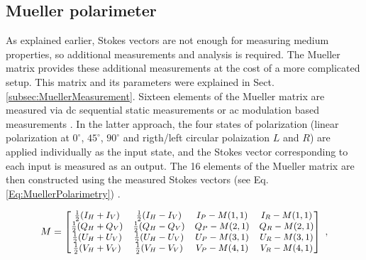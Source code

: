 %
%

	
\subsection{Mueller polarimeter}
As explained earlier, Stokes vectors are not enough for measuring medium properties, so additional measurements and analysis is required.
The Mueller matrix provides these additional measurements at the cost of a more complicated setup.
This matrix and its parameters were explained in Sect.\,\ref{subsec:MuellerMeasurement}.
Sixteen elements of the Mueller matrix are measured via \acf{dc} sequential static measurements or \acf{ac} modulation based measurements \cite{ghosh2011tissue}.
In the latter approach, the four states of polarization (linear polarization at $0^{\circ}$, $45^{\circ}$, $90^{\circ}$ and rigth/left circular polaization $L$ and $R$) are applied individually as the input state, and the Stokes vector corresponding to each input is measured as an output.
The 16 elements of the Mueller matrix are then constructed using the measured Stokes vectors (see Eq. \ref{Eq:MuellerPolarimetry}) \cite{ghosh2009mueller}. 
	
	\begin{equation}\label{Eq:MuellerPolarimetry}
	\small
	M = 
	\begin{bmatrix}
	\frac{1}{2}(I_{H}+I_{V}) &  \frac{1}{2}(I_{H}-I_{V}) &  I_{P}-M(1,1) &  I_{R}-M(1,1)\\
    \frac{1}{2}(Q_{H}+Q_{V}) &  \frac{1}{2}(Q_{H}-Q_{V}) &  Q_{P}-M(2,1) &  Q_{R}-M(2,1)\\
	\frac{1}{2}(U_{H}+U_{V}) &  \frac{1}{2}(U_{H}-U_{V}) &  U_{P}-M(3,1) &  U_{R}-M(3,1)\\
	\frac{1}{2}(V_{H}+V_{V}) &  \frac{1}{2}(V_{H}-V_{V}) &  V_{P}-M(4,1) &  V_{R}-M(4,1)\\		
	\end{bmatrix}~,
	\end{equation}\\
	
